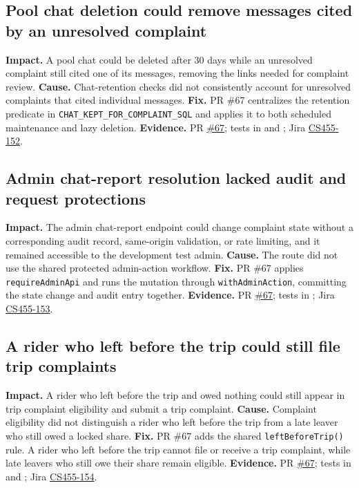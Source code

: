 \documentclass[10pt]{article}
\begin{document}
\subsection{Pool chat deletion could remove messages cited by an unresolved complaint}
\textbf{Impact.} A pool chat could be deleted after 30 days while an unresolved complaint still cited one of its messages, removing the links needed for complaint review.
\textbf{Cause.} Chat-retention checks did not consistently account for unresolved complaints that cited individual messages.
\textbf{Fix.} PR \#67 centralizes the retention predicate in \texttt{CHAT\_KEPT\_FOR\_COMPLAINT\_SQL} and applies it to both scheduled maintenance and lazy deletion.
\textbf{Evidence.} PR \href{https://github.com/CS455-Carpooling/Campus_Ridepooling_Automation/pull/67}{\#67}; tests in  and ; Jira \href{https://cs455project.atlassian.net/browse/CS455-152}{CS455-152}.

\subsection{Admin chat-report resolution lacked audit and request protections}
\textbf{Impact.} The admin chat-report endpoint could change complaint state without a corresponding audit record, same-origin validation, or rate limiting, and it remained accessible to the development test admin.
\textbf{Cause.} The route did not use the shared protected admin-action workflow.
\textbf{Fix.} PR \#67 applies \texttt{requireAdminApi} and runs the mutation through \texttt{withAdminAction}, committing the state change and audit entry together.
\textbf{Evidence.} PR \href{https://github.com/CS455-Carpooling/Campus_Ridepooling_Automation/pull/67}{\#67}; tests in ; Jira \href{https://cs455project.atlassian.net/browse/CS455-153}{CS455-153}.

\subsection{A rider who left before the trip could still file trip complaints}
\textbf{Impact.} A rider who left before the trip and owed nothing could still appear in trip complaint eligibility and submit a trip complaint.
\textbf{Cause.} Complaint eligibility did not distinguish a rider who left before the trip from a late leaver who still owed a locked share.
\textbf{Fix.} PR \#67 adds the shared \texttt{leftBeforeTrip()} rule. A rider who left before the trip cannot file or receive a trip complaint, while late leavers who still owe their share remain eligible.
\textbf{Evidence.} PR \href{https://github.com/CS455-Carpooling/Campus_Ridepooling_Automation/pull/67}{\#67}; tests in  and ; Jira \href{https://cs455project.atlassian.net/browse/CS455-154}{CS455-154}.
\end{document}
